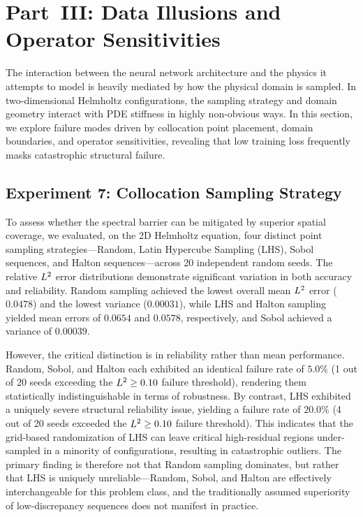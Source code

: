 \section{Part~III: Data Illusions and Operator Sensitivities}\label{sec:part3}

The interaction between the neural network architecture and the physics it attempts to model is heavily mediated by how the physical domain is sampled. In two-dimensional Helmholtz configurations, the sampling strategy and domain geometry interact with PDE stiffness in highly non-obvious ways. In this section, we explore failure modes driven by collocation point placement, domain boundaries, and operator sensitivities, revealing that low training loss frequently masks catastrophic structural failure.

\subsection{Experiment 7: Collocation Sampling Strategy}\label{sec:exp7}

To assess whether the spectral barrier can be mitigated by superior spatial coverage, we evaluated, on the 2D Helmholtz equation, four distinct point sampling strategies—Random, Latin Hypercube Sampling (LHS), Sobol sequences, and Halton sequences—across 20 independent random seeds. The relative $L^2$ error distributions demonstrate significant variation in both accuracy and reliability. Random sampling achieved the lowest overall mean $L^2$ error ($0.0478$) and the lowest variance ($0.00031$), while LHS and Halton sampling yielded mean errors of $0.0654$ and $0.0578$, respectively, and Sobol achieved a variance of $0.00039$. 

However, the critical distinction is in reliability rather than mean performance. Random, Sobol, and Halton each exhibited an identical failure rate of $5.0\%$ (1 out of 20 seeds exceeding the $L^2 \ge 0.10$ failure threshold), rendering them statistically indistinguishable in terms of robustness. By contrast, LHS exhibited a uniquely severe structural reliability issue, yielding a failure rate of $20.0\%$ (4 out of 20 seeds exceeded the $L^2 \ge 0.10$ failure threshold). This indicates that the grid-based randomization of LHS can leave critical high-residual regions under-sampled in a minority of configurations, resulting in catastrophic outliers. The primary finding is therefore not that Random sampling dominates, but rather that LHS is uniquely unreliable—Random, Sobol, and Halton are effectively interchangeable for this problem class, and the traditionally assumed superiority of low-discrepancy sequences does not manifest in practice.

